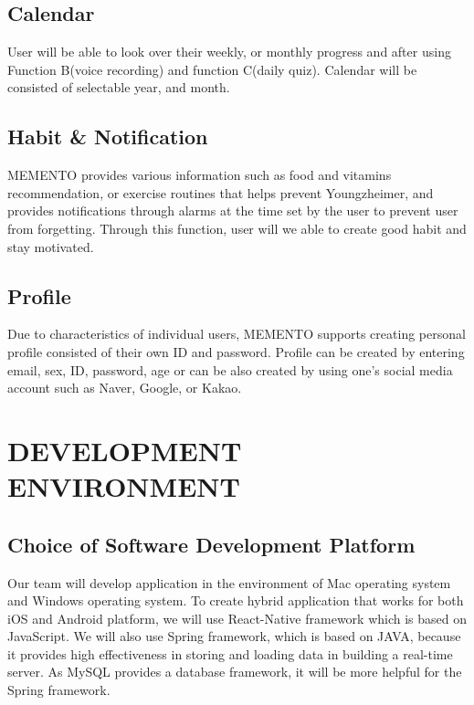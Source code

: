 \documentclass[conference]{IEEEtran}
\begin{document}
\subsection{Calendar}
User will be able to look over their weekly, or monthly progress and after using Function B(voice recording) and function C(daily quiz). Calendar will be consisted of selectable year, and month.\\
\subsection{Habit \& Notification}
MEMENTO provides various information such as food and vitamins recommendation, or exercise routines that helps prevent Youngzheimer, and provides notifications through alarms at the time set by the user to prevent user from forgetting. Through this function, user will we able to create good habit and stay motivated.\\
\subsection{Profile}
Due to characteristics of individual users, MEMENTO supports creating personal profile consisted of their own ID and password. Profile can be created by entering email, sex, ID, password, age or can be also created by using one's social media account such as Naver, Google, or Kakao.\\

\section{DEVELOPMENT ENVIRONMENT}
\subsection{Choice of Software Development Platform}

Our team will develop application in the environment of Mac operating system and Windows operating system. To create hybrid application that works for both iOS and Android platform, we will use React-Native framework which is based on JavaScript. We will also use Spring framework, which is based on JAVA, because it provides high effectiveness in storing and loading data in building a real-time server. As MySQL provides a database framework, it will be more helpful for the Spring framework.
\end{document}
